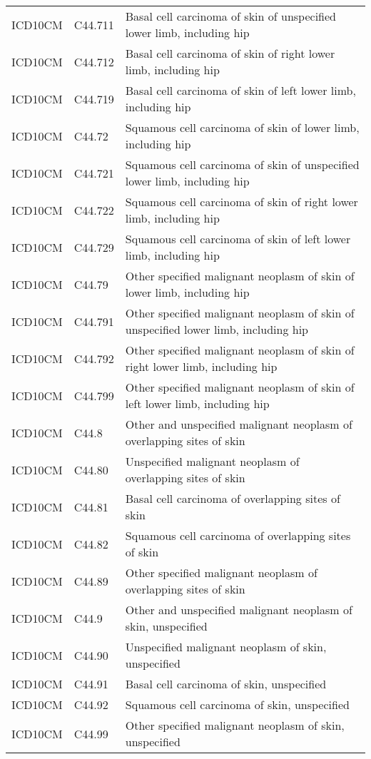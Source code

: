 \begin{table}[ht]
\begin{tabular}{lll}
  ICD10CM & C44.711 & Basal cell carcinoma of skin of unspecified lower limb, including hip \\ 
  ICD10CM & C44.712 & Basal cell carcinoma of skin of right lower limb, including hip \\ 
  ICD10CM & C44.719 & Basal cell carcinoma of skin of left lower limb, including hip \\ 
  ICD10CM & C44.72 & Squamous cell carcinoma of skin of lower limb, including hip \\ 
  ICD10CM & C44.721 & Squamous cell carcinoma of skin of unspecified lower limb, including hip \\ 
  ICD10CM & C44.722 & Squamous cell carcinoma of skin of right lower limb, including hip \\ 
  ICD10CM & C44.729 & Squamous cell carcinoma of skin of left lower limb, including hip \\ 
  ICD10CM & C44.79 & Other specified malignant neoplasm of skin of lower limb, including hip \\ 
  ICD10CM & C44.791 & Other specified malignant neoplasm of skin of unspecified lower limb, including hip \\ 
  ICD10CM & C44.792 & Other specified malignant neoplasm of skin of right lower limb, including hip \\ 
  ICD10CM & C44.799 & Other specified malignant neoplasm of skin of left lower limb, including hip \\ 
  ICD10CM & C44.8 & Other and unspecified malignant neoplasm of overlapping sites of skin \\ 
  ICD10CM & C44.80 & Unspecified malignant neoplasm of overlapping sites of skin \\ 
  ICD10CM & C44.81 & Basal cell carcinoma of overlapping sites of skin \\ 
  ICD10CM & C44.82 & Squamous cell carcinoma of overlapping sites of skin \\ 
  ICD10CM & C44.89 & Other specified malignant neoplasm of overlapping sites of skin \\ 
  ICD10CM & C44.9 & Other and unspecified malignant neoplasm of skin, unspecified \\ 
  ICD10CM & C44.90 & Unspecified malignant neoplasm of skin, unspecified \\ 
  ICD10CM & C44.91 & Basal cell carcinoma of skin, unspecified \\ 
  ICD10CM & C44.92 & Squamous cell carcinoma of skin, unspecified \\ 
  ICD10CM & C44.99 & Other specified malignant neoplasm of skin, unspecified \\ 

\end{tabular}
\end{table}
